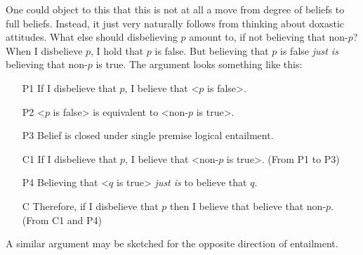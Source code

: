 \documentclass[12pt,numbers=noenddot]{scrartcl}
\begin{document}
One could object to this that this is not at all a move from degree of beliefs to full beliefs. Instead, it just very naturally follows from thinking about doxastic attitudes. What else should disbelieving $p$ amount to, if not believing that non-$p$? When I disbelieve $p$, I hold that $p$ is false. But believing that $p$ is false \emph{just is} believing that non-$p$ is true. The argument looks something like this:

\begin{enumerate}
\item [P1] If I disbelieve that $p$, I believe that <$p$ is false>. 
\item [P2] <$p$ is false> is equivalent to <non-$p$ is true>.
\item [P3] Belief is closed under single premise logical entailment.
\item [C1] If I disbelieve that $p$, I believe that <non-$p$ is true>. (From P1 to P3)
\item [P4] Believing that <$q$ is true> \emph{just is} to believe that $q$.
\item [C] Therefore, if I disbelieve that $p$ then I believe that believe that non-$p$. (From C1 and P4)
\end{enumerate}

A similar argument may be sketched for the opposite direction of entailment.
\end{document}
